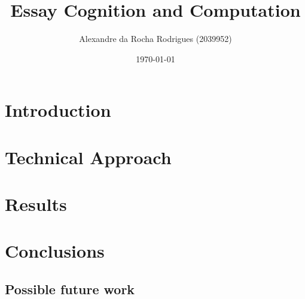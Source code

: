 \documentclass[a4paper, 11pt]{article}
\begin{document}
	
	\title{Essay Cognition and Computation }
	\author{{\small Alexandre da Rocha Rodrigues (2039952)}}
	\date{\today}
	\maketitle
	
	\section{Introduction}
		
	\section{Technical Approach}
		
	\section{Results}
				
	
	\section{Conclusions}
		
		
		\subsection{Possible future work}
			
\end{document}
